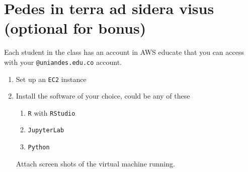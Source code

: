\documentclass[12pt,onecolumn]{article}
\begin{document}
\section{Pedes in terra ad sidera visus (optional for bonus)}

Each student in the class has an account in AWS educate that you can access with your \texttt{@uniandes.edu.co} account.

\begin{enumerate}
  \item Set up an \texttt{EC2} instance
  \item Install the software of your choice, could be any of these
  \begin{enumerate}
    \item \texttt{R} with \texttt{RStudio}
    \item \texttt{JupyterLab}
    \item \texttt{Python}
  \end{enumerate}

Attach screen shots of the virtual machine running.   
\end{enumerate}
\end{document}
